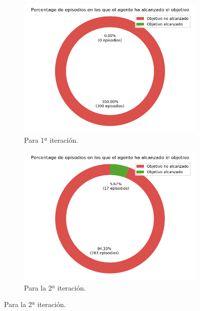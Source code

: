 \begin{figure}
    \centering
    \begin{subfigure}{.5\textwidth}
        \centering
        \includegraphics[scale=0.3]{cap5_experimentacion/images/CHANGE_GOAL-20_09-21_47-1, 2, 0_it1_porcentajeRecompensa.png}
        \caption{Para 1ª iteración.}
        \label{fig:HANGE_GOAL-20_09-21_47-1, 2, 0_it1_porcentajeRecompensa}
    \end{subfigure}%
    \begin{subfigure}{.5\textwidth}
        \centering
        \includegraphics[scale=0.3]{cap5_experimentacion/images/CHANGE_GOAL-20_09-21_47-1, 2, 0_it2_porcentajeResuelto.png}
        \caption{Para la 2ª iteración.}
        \label{fig:HANGE_GOAL-20_09-21_47-1, 2, 0_it2_porcentajeRecompensa}

\end{subfigure}
\end{figure}

